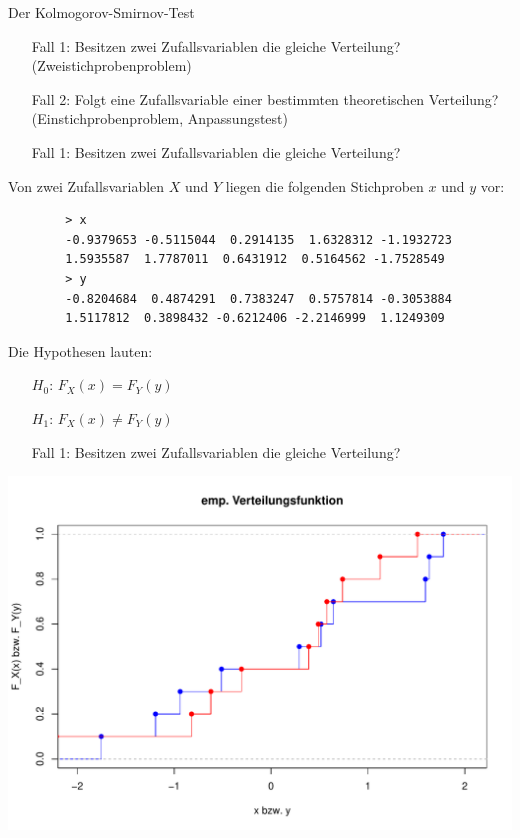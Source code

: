 \documentclass[t,11pt,aspectratio=169]{beamer}
\begin{document}
\begin{frame}{Der Kolmogorov-Smirnov-Test}
	\begin{enumerate}
		\item[Fall 1:] Besitzen zwei Zufallsvariablen die gleiche Verteilung? (Zweistichprobenproblem)
		\item[Fall 2:] Folgt eine Zufallsvariable einer bestimmten theoretischen Verteilung? (Einstichprobenproblem, Anpassungstest)
	\end{enumerate}
\end{frame}

\begin{frame}[fragile]
	\begin{enumerate}
		\item[Fall 1:] Besitzen zwei Zufallsvariablen die gleiche Verteilung?
	\end{enumerate}
	Von zwei Zufallsvariablen $X$ und $Y$ liegen die folgenden Stichproben $x$ und $y$ vor:
	\begin{verbatim}
		> x
		-0.9379653 -0.5115044  0.2914135  1.6328312 -1.1932723  
		1.5935587  1.7787011  0.6431912  0.5164562 -1.7528549
		> y
		-0.8204684  0.4874291  0.7383247  0.5757814 -0.3053884  
		1.5117812  0.3898432 -0.6212406 -2.2146999  1.1249309
	\end{verbatim}
	\pause Die Hypothesen lauten:
	\begin{enumerate}
		\item[$H_0$:] $F_X(x) = F_Y(y)$
		\item[$H_1$:] $F_X(x) \neq F_Y(y)$
	\end{enumerate}
\end{frame}

\begin{frame}
\begin{enumerate}
	\item[Fall 1:] Besitzen zwei Zufallsvariablen die gleiche Verteilung?
\end{enumerate}
\begin{center}
	\includegraphics[scale=0.45]{Rplot.pdf}
\end{center}
\end{frame}
\end{document}

